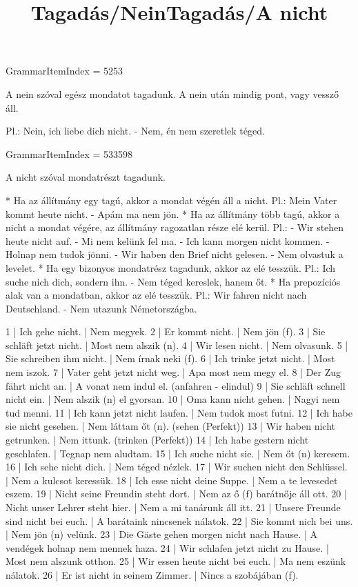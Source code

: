 \title{Tagadás/Nein}

GrammarItemIndex = 5253

\begin{desc}
A nein szóval egész mondatot tagadunk. A nein után mindig pont, vagy vessző áll.

Pl.: Nein, ich liebe dich nicht. - Nem, én nem szeretlek téged.
\end{desc}

\begin{exmp}
\end{exmp}

\title{Tagadás/A nicht}

GrammarItemIndex = 533598

\begin{desc}
A nicht szóval mondatrészt tagadunk.

* Ha az állítmány egy tagú, akkor a mondat végén áll a nicht.
  Pl.: Mein Vater kommt heute nicht. - Apám ma nem jön.
* Ha az állítmány több tagú, akkor a nicht a mondat végére, az állítmány ragozatlan része elé kerül.
  Pl.: - Wir stehen heute nicht auf. - Mi nem kelünk fel ma.
       - Ich kann morgen nicht kommen. - Holnap nem tudok jönni.
       - Wir haben den Brief nicht gelesen. - Nem olvastuk a levelet.
* Ha egy bizonyos mondatrész tagadunk, akkor az elé tesszük.
  Pl.: Ich suche nich dich, sondern ihn. - Nem téged kereslek, hanem őt.
* Ha prepozíciós alak van a mondatban, akkor az elé tesszük.
  Pl.: Wir fahren nicht nach Deutschland. - Nem utazunk Németországba.
\end{desc}

\begin{exmp}
1 | Ich gehe nicht. | Nem megyek.
2 | Er kommt nicht. | Nem jön (f).
3 | Sie schläft jetzt nicht. | Most nem alszik (n).
4 | Wir lesen nicht. | Nem olvasunk.
5 | Sie schreiben ihm nicht. | Nem írnak neki (f).
6 | Ich trinke jetzt nicht. | Most nem iszok.
7 | Vater geht jetzt nicht weg. | Apa most nem megy el.
8 | Der Zug fährt nicht an. | A vonat nem indul el. (anfahren - elindul)
9 | Sie schläft schnell nicht ein. | Nem alszik (n) el gyorsan.
10 | Oma kann nicht gehen. | Nagyi nem tud menni.
11 | Ich kann jetzt nicht laufen. | Nem tudok most futni.
12 | Ich habe sie nicht gesehen. | Nem láttam őt (n). (sehen (Perfekt))
13 | Wir haben nicht getrunken. | Nem ittunk. (trinken (Perfekt))
14 | Ich habe gestern nicht geschlafen. | Tegnap nem aludtam.
15 | Ich suche nicht sie. | Nem őt (n) keresem.
16 | Ich sehe nicht dich. | Nem téged nézlek.
17 | Wir suchen nicht den Schlüssel. | Nem a kulcsot keressük.
18 | Ich esse nicht deine Suppe. | Nem a te levesedet eszem.
19 | Nicht seine Freundin steht dort. | Nem az ő (f) barátnője áll ott.
20 | Nicht unser Lehrer steht hier. | Nem a mi tanárunk áll itt.
21 | Unsere Freunde sind nicht bei euch. | A barátaink nincsenek nálatok.
22 | Sie kommt nich bei uns. | Nem jön (n) velünk.
23 | Die Gäste gehen morgen nicht nach Hause. | A vendégek holnap nem mennek haza.
24 | Wir schlafen jetzt nicht zu Hause. | Most nem alszunk otthon.
25 | Wir essen heute nicht bei euch. | Ma nem eszünk nálatok.
26 | Er ist nicht in seinem Zimmer. | Nincs a szobájában (f).
\end{exmp}

